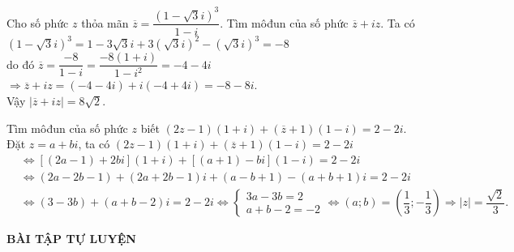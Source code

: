 \begin{vd}%
	Cho số phức $z$ thỏa mãn $\overline{z}=\dfrac{\left(1-\sqrt{3}i \right)^3}{1-i}$. Tìm môđun của số phức $\overline{z}+iz$.
	\loigiai
	{
		Ta có $\left(1-\sqrt{3}i \right)^3=1-3\sqrt{3}i+3\left(\sqrt{3}i\right)^2-\left(\sqrt{3}i \right)^3=-8$ \\
		do đó $\overline{z}=\dfrac{-8}{1-i}=\dfrac{-8\left(1+i \right)}{1-i^2}=-4-4i$\\
		$\Rightarrow \overline{z}+iz=\left(-4-4i \right)+i\left(-4+4i \right)=-8-8i$.\\
		Vậy $\left|\overline{z}+iz \right|=8\sqrt{2}$. 	
	}
\end{vd}

\begin{vd}%
	Tìm môđun của số phức $z$ biết $\left(2z-1 \right)\left(1+i \right)+\left(\overline{z}+1 \right)\left(1-i \right)=2-2i$.
	\loigiai 
	{
		Đặt $z=a+bi$, ta có $\left(2z-1 \right)\left(1+i \right)+\left(\overline{z}+1 \right)\left(1-i \right)=2-2i$
		\begin{align*}
		&\Leftrightarrow  \left[\left( 2a-1\right)+2bi\right]\left(1+i \right)+\left[\left( a+1\right)-bi \right]\left(1-i \right)=2-2i  \\
		&\Leftrightarrow \left(2a-2b-1 \right)+\left(2a+2b-1 \right)i+\left(a-b+1 \right)-\left(a+b+1 \right)i=2-2i\\
		&\Leftrightarrow \left(3-3b \right)+\left(a+b-2 \right)i=2-2i\Leftrightarrow \begin{cases}3a-3b=2 \\a+b-2=-2 \end{cases}\Leftrightarrow \left(a;b \right)=\left(\dfrac{1}{3};-\dfrac{1}{3} \right)\Rightarrow \left|z \right|=\dfrac{\sqrt{2}}{3}.
		\end{align*}
	}
\end{vd}
\begin{center}
	\textbf{BÀI TẬP TỰ LUYỆN}
\end{center}
